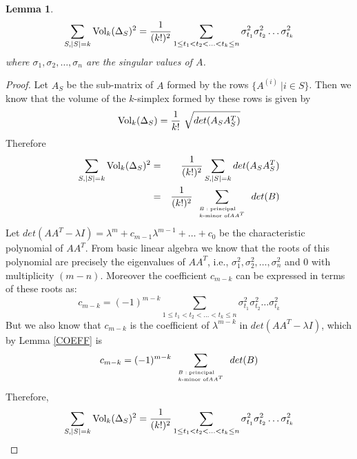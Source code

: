 \documentclass{book}
\newtheorem{lemma}[theorem]{Lemma}
\numberwithin{exercise}{chapter}
\begin{document}
\begin{lemma}\label{VOLFORMULA}
\[ \sum_{S, |S|=k} \mbox{Vol}_k (\Delta_S)^2 = \frac{1}{(k!)^2} \sum_{1 \leq
t_1 < t_2 < \ldots < t_k \leq n} \sigma_{t_1}^2 \sigma_{t_2}^2
\ldots \sigma_{t_k}^2 \] where $\sigma_1, \sigma_2, \ldots,
\sigma_n$ are the singular values of $A$.
\end{lemma}
\begin{proof}
Let $A_S$ be the sub-matrix of $A$ formed by the rows $\{ A^{(i)}~
| i \in S \}$. Then we know that the volume of the $k$-simplex
formed by these rows is given by \[ \mbox{Vol}_k (\Delta_S) =
\frac{1}{k!}~ \sqrt{det(A_S A_S^T)} \] Therefore
\begin{eqnarray*}
\sum_{S, |S|=k} \mbox{Vol}_k (\Delta_S)^2 &=& \frac{1}{(k!)^2} \sum_{S, |S|=k} det(A_S A_S^T) \\
&=& \frac{1}{(k!)^2} \sum_{\tiny \begin{array}{l} B: \mbox{principal} \\ k\mbox{-minor of} AA^T \end{array}} det(B) \\
\end{eqnarray*}
Let $det(AA^T - \lambda I) = \lambda^m + c_{m-1} \lambda^{m-1} +
\ldots + c_0$ be the characteristic polynomial of $AA^T$. From
basic linear algebra we know that the roots of this polynomial are
precisely the eigenvalues of $AA^T$, i.e., $\sigma_1^2,
\sigma_2^2, \ldots, \sigma_n^2$ and $0$ with multiplicity $(m-n)$.
Moreover the coefficient $c_{m-k}$ can be expressed in terms of
these roots as:
\[ c_{m-k} = (-1)^{m-k} \sum_{1 \leq t_1 < t_2 < \ldots < t_k \leq
n} \sigma_{t_1}^2 \sigma_{t_2}^2 \ldots \sigma_{t_k}^2
\]
But we also know that $c_{m-k}$ is the coefficient of
$\lambda^{m-k}$ in $det(AA^T - \lambda I)$, which by Lemma
\ref{COEFF} is
\[ c_{m-k}
= (-1)^{m-k} \sum_{\tiny \begin{array}{l} B: \mbox{principal} \\
k\mbox{-minor of} AA^T \end{array}} det(B) \] Therefore, \[
\sum_{S, |S|=k} \mbox{Vol}_k (\Delta_S)^2 = \frac{1}{(k!)^2} \sum_{1
\leq t_1 < t_2 < \ldots < t_k \leq n} \sigma_{t_1}^2
\sigma_{t_2}^2 \ldots \sigma_{t_k}^2 \]
\end{proof}
\end{document}
